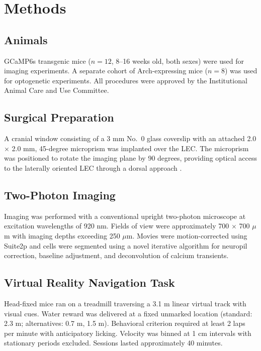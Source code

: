 \documentclass[11pt]{article}
\begin{document}
\section{Methods}

\subsection{Animals}

GCaMP6s transgenic mice ($n = 12$, 8--16 weeks old, both sexes) were used for imaging experiments. A separate cohort of Arch-expressing mice ($n = 8$) was used for optogenetic experiments. All procedures were approved by the Institutional Animal Care and Use Committee.

\subsection{Surgical Preparation}

A cranial window consisting of a 3 mm No.\ 0 glass coverslip with an attached 2.0 $\times$ 2.0 mm, 45-degree microprism was implanted over the LEC. The microprism was positioned to rotate the imaging plane by 90 degrees, providing optical access to the laterally oriented LEC through a dorsal approach \citep{witter2017}.

\subsection{Two-Photon Imaging}

Imaging was performed with a conventional upright two-photon microscope at excitation wavelengths of 920 nm. Fields of view were approximately 700 $\times$ 700 $\mu$m with imaging depths exceeding 250 $\mu$m. Movies were motion-corrected using Suite2p \citep{pachitariu2016} and cells were segmented using a novel iterative algorithm for neuropil correction, baseline adjustment, and deconvolution of calcium transients.

\subsection{Virtual Reality Navigation Task}

Head-fixed mice ran on a treadmill traversing a 3.1 m linear virtual track with visual cues. Water reward was delivered at a fixed unmarked location (standard: 2.3 m; alternatives: 0.7 m, 1.5 m). Behavioral criterion required at least 2 laps per minute with anticipatory licking. Velocity was binned at 1 cm intervals with stationary periods excluded. Sessions lasted approximately 40 minutes.
\end{document}
